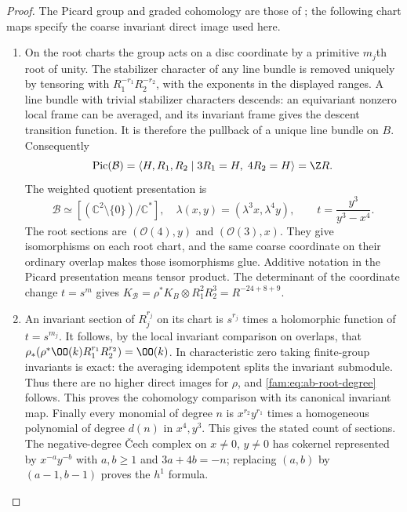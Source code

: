 \begin{proof}
The Picard group and graded cohomology are those of
\cite[Lemma~6.1, p.~74]{DuEtAl2026v1}; the following chart maps specify
the coarse invariant direct image used here.
\begin{enumerate}[label=\arabic*.,leftmargin=*]
\item On the root charts the group acts on a disc coordinate by a primitive
$m_j$th root of unity. The stabilizer character of any line bundle is
removed uniquely by tensoring with $R_1^{-r_1}R_2^{-r_2}$, with the
exponents in the displayed ranges. A line bundle with trivial stabilizer
characters descends: an equivariant nonzero local frame can be averaged,
and its invariant frame gives the descent transition function. It is
therefore the pullback of a unique line bundle on $B$. Consequently
\[
 \operatorname{Pic}(\mathcal B)=
 \langle H,R_1,R_2\mid 3R_1=H,\;4R_2=H\rangle=\Z R.
\]
The weighted quotient presentation is
\[
 \mathcal B\simeq[(\mathbb C^2\setminus\{0\})/\mathbb C^*],
 \quad\lambda(x,y)=(\lambda^3x,\lambda^4y),\qquad
 t=\frac{y^3}{y^3-x^4}.
\]
The root sections are $(\mathcal O(4),y)$ and $(\mathcal O(3),x)$.
They give isomorphisms on each root chart, and the same coarse
coordinate on their ordinary overlap makes those isomorphisms glue.
Additive notation in the Picard presentation means tensor product. The determinant of the coordinate change $t=s^m$ gives
$K_{\mathcal B}=\rho^*K_B\otimes R_1^2R_2^3=R^{-24+8+9}$.

\item An invariant section of $R_j^{r_j}$ on its chart is $s^{r_j}$ times a
holomorphic function of $t=s^{m_j}$. It follows, by the local invariant
comparison on overlaps, that
$\rho_*(\rho^*\OO(k)R_1^{r_1}R_2^{r_2})=\OO(k)$.
In characteristic zero taking finite-group invariants is exact: the
averaging idempotent splits the invariant submodule. Thus there are no
higher direct images for $\rho$, and \eqref{fam:eq:ab-root-degree} follows. This proves the
cohomology comparison with its canonical invariant map. Finally every monomial of degree $n$ is
$x^{r_2}y^{r_1}$ times a homogeneous polynomial of degree $d(n)$ in
$x^4,y^3$. This gives the stated count of sections. The negative-degree
\v Cech complex on $x\ne0$, $y\ne0$ has cokernel represented by
$x^{-a}y^{-b}$ with $a,b\ge1$ and $3a+4b=-n$; replacing $(a,b)$ by
$(a-1,b-1)$ proves the $h^1$ formula. \end{enumerate}
\end{proof}